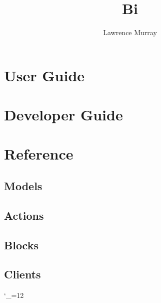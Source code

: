 \documentclass[a4paper,twoside,notitlepage]{refrep}
\title{Bi}
\author{Lawrence Murray}
\date{}
\begin{document}
\maketitle

\tableofcontents

\newpage

\chapter{User Guide\label{User_Guide}}



\chapter{Developer Guide\label{Developer_Guide}}



\chapter{Reference\label{Reference}}

\section{Models}


\section{Actions}


\section{Blocks}


\section{Clients}



\begingroup \catcode`_=12 %
\printindex
\endgroup
\end{document}
